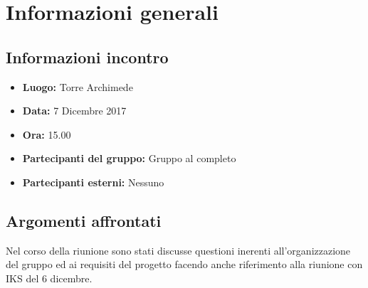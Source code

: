 \section{Informazioni generali}
\subsection{Informazioni incontro}
\begin{itemize}
	\item { \textbf{Luogo:} Torre Archimede  }
	\item { \textbf{Data:} 7 Dicembre 2017 }
	\item { \textbf{Ora:} 15.00 }
	\item { \textbf{Partecipanti del gruppo:} Gruppo al completo }
	\item { \textbf{Partecipanti esterni:} Nessuno }
\end{itemize}


\subsection{Argomenti affrontati}
Nel corso della riunione sono stati discusse questioni inerenti all'organizzazione del gruppo ed ai requisiti del progetto facendo anche riferimento alla riunione con IKS del 6 dicembre.


